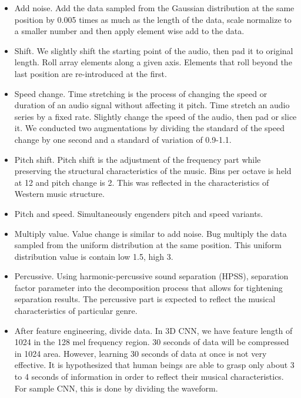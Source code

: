 \documentclass[sn-mathphys]{sn-jnl}%
\theoremstyle{thmstyleone}%
\theoremstyle{thmstyletwo}%
\theoremstyle{thmstylethree}%
\begin{document}
\begin{itemize}
	\item Add noise. 
	Add the data sampled from the Gaussian distribution at the same position by 0.005 times as much as the length of the data, scale normalize to a smaller number and then apply element wise add to the data.
	
	\item Shift. We slightly shift the starting point of the audio, then pad it to original length.
	Roll array elements along a given axis.
	Elements that roll beyond the last position are re-introduced at the first.
	
	\item Speed change. 
	Time stretching is the process of changing the speed or duration of an audio signal without affecting it pitch.
	Time stretch an audio series by a fixed rate.
	Slightly change the speed of the audio, then pad or slice it.
	We conducted two augmentations by dividing the standard of the speed change by one second and a standard of variation of 0.9-1.1.
	
	\item  Pitch shift.
	Pitch shift is the adjustment of the frequency part while preserving the structural characteristics of the music.
	Bins per octave is held at 12 and pitch change is 2.
	This was reflected in the characteristics of Western music structure.
	
	\item Pitch and speed.
	Simultaneously engenders pitch and speed variants.
	
	\item Multiply value.
	Value change is similar to add noise.
	Bug multiply the data sampled from the uniform distribution at the same position.
	This uniform distribution value is contain low 1.5, high 3.
	
	\item Percussive.
	Using harmonic-percussive sound separation (HPSS), separation factor parameter into the decomposition process that allows for tightening separation results.
	The percussive part is expected to reflect the musical characteristics of particular genre.
	
	\item After feature engineering, divide data.
	In 3D CNN, we have feature length of 1024 in the 128 mel frequency region.
	30 seconds of data will be compressed in 1024 area.
	However, learning 30 seconds of data at once is not very effective.
	It is hypothesized that human beings are able to grasp only about 3 to 4 seconds of information in order to reflect their musical characteristics.
	For sample CNN, this is done by dividing the waveform.
\end{itemize}
\end{document}
